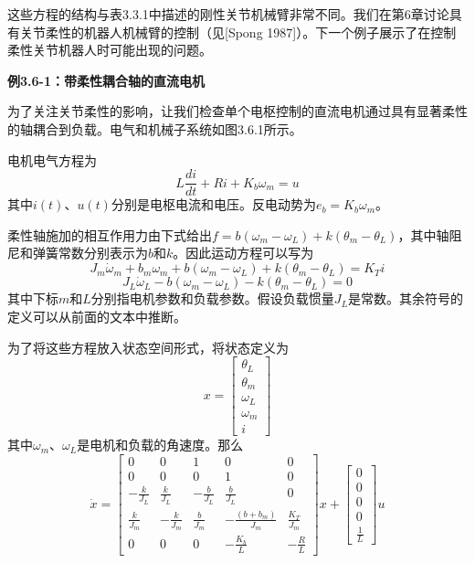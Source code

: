 \documentclass[12pt,a4paper]{ctexart}
\begin{document}
这些方程的结构与表3.3.1中描述的刚性关节机械臂非常不同。我们在第6章讨论具有关节柔性的机器人机械臂的控制（见[Spong 1987]）。下一个例子展示了在控制柔性关节机器人时可能出现的问题。

\textbf{例3.6-1：带柔性耦合轴的直流电机}

为了关注关节柔性的影响，让我们检查单个电枢控制的直流电机通过具有显著柔性的轴耦合到负载。电气和机械子系统如图3.6.1所示。

电机电气方程为
\begin{equation}
L\frac{di}{dt} + Ri + K_b\omega_m = u
\end{equation}
其中$i(t)$、$u(t)$分别是电枢电流和电压。反电动势为$e_b = K_b\omega_m$。

柔性轴施加的相互作用力由下式给出$f = b(\omega_m - \omega_L) + k(\theta_m - \theta_L)$，其中轴阻尼和弹簧常数分别表示为$b$和$k$。因此运动方程可以写为
\begin{equation}
J_m\dot{\omega}_m + b_m\omega_m + b(\omega_m - \omega_L) + k(\theta_m - \theta_L) = K_T i
\end{equation}
\begin{equation}
J_L\dot{\omega}_L - b(\omega_m - \omega_L) - k(\theta_m - \theta_L) = 0
\end{equation}
其中下标$m$和$L$分别指电机参数和负载参数。假设负载惯量$J_L$是常数。其余符号的定义可以从前面的文本中推断。

为了将这些方程放入状态空间形式，将状态定义为
\begin{equation}
x = \begin{bmatrix} \theta_L \\ \theta_m \\ \omega_L \\ \omega_m \\ i \end{bmatrix}
\end{equation}
其中$\omega_m$、$\omega_L$是电机和负载的角速度。那么
\begin{equation}
\dot{x} = \begin{bmatrix} 0 & 0 & 1 & 0 & 0 \\ 0 & 0 & 0 & 1 & 0 \\ -\frac{k}{J_L} & \frac{k}{J_L} & -\frac{b}{J_L} & \frac{b}{J_L} & 0 \\ \frac{k}{J_m} & -\frac{k}{J_m} & \frac{b}{J_m} & -\frac{(b+b_m)}{J_m} & \frac{K_T}{J_m} \\ 0 & 0 & 0 & -\frac{K_b}{L} & -\frac{R}{L} \end{bmatrix}x + \begin{bmatrix} 0 \\ 0 \\ 0 \\ 0 \\ \frac{1}{L} \end{bmatrix}u
\end{equation}
\end{document}
